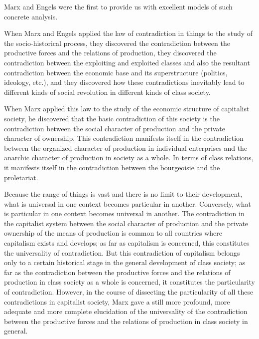 \documentclass{article}
\begin{document}
Marx and Engels were the first to provide us with excellent models of such
concrete analysis.

When Marx and Engels applied the law of contradiction in things to the study of
the socio-historical process, they discovered the contradiction between the
productive forces and the relations of production, they discovered the
contradiction between the exploiting and exploited classes and also the
resultant contradiction between the economic base and its superstructure
(politics, ideology, etc.), and they discovered how these contradictions
inevitably lead to different kinds of social revolution in different kinds of
class society.

When Marx applied this law to the study of the economic structure of capitalist
society, he discovered that the basic contradiction of this society is the
contradiction between the social character of production and the private
character of ownership. This contradiction manifests itself in the
contradiction between the organized character of production in individual
enterprises and the anarchic character of production in society as a whole. In
terms of class relations, it manifests itself in the contradiction between the
bourgeoisie and the proletariat.

Because the range of things is vast and there is no limit to their development,
what is universal in one context becomes particular in another. Conversely,
what is particular in one context becomes universal in another. The
contradiction in the capitalist system between the social character of
production and the private ownership of the means of production is common to
all countries where capitalism exists and develops; as far as capitalism is
concerned, this constitutes the universality of contradiction. But this
contradiction of capitalism belongs only to a certain historical stage in the
general development of class society; as far as the contradiction between the
productive forces and the relations of production in class society as a whole
is concerned, it constitutes the particularity of contradiction. However, in
the course of dissecting the particularity of all these contradictions in
capitalist society, Marx gave a still more profound, more adequate and more
complete elucidation of the universality of the contradiction between the
productive forces and the relations of production in class society in general.
\end{document}
